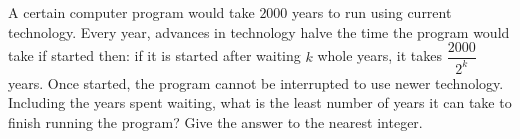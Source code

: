 A certain computer program would take $2000$ years to run using current technology. Every year, advances in technology halve the time the program would take if started then: if it is started after waiting $k$ whole years, it takes $\dfrac{2000}{2^k}$ years. Once started, the program cannot be interrupted to use newer technology. Including the years spent waiting, what is the least number of years it can take to finish running the program? Give the answer to the nearest integer.

